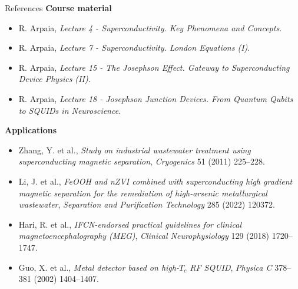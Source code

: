 \documentclass[aspectratio=169,11pt]{beamer}
\begin{document}
\begin{frame}[allowframebreaks]{References}
\label{slide:references}
\footnotesize
\textbf{Course material}
\begin{itemize}
  \item R. Arpaia, \textit{Lecture 4 - Superconductivity. Key Phenomena and Concepts}.
  \item R. Arpaia, \textit{Lecture 7 - Superconductivity. London Equations (I)}.
  \item R. Arpaia, \textit{Lecture 15 - The Josephson Effect. Gateway to Superconducting Device Physics (II)}.
  \item R. Arpaia, \textit{Lecture 18 - Josephson Junction Devices. From Quantum Qubits to SQUIDs in Neuroscience}.
\end{itemize}

\textbf{Applications}
\begin{itemize}
  \item Zhang, Y. et al., \textit{Study on industrial wastewater treatment using superconducting magnetic separation}, \textit{Cryogenics} 51 (2011) 225--228.
  \item Li, J. et al., \textit{FeOOH and nZVI combined with superconducting high gradient magnetic separation for the remediation of high-arsenic metallurgical wastewater}, \textit{Separation and Purification Technology} 285 (2022) 120372.
  \item Hari, R. et al., \textit{IFCN-endorsed practical guidelines for clinical magnetoencephalography (MEG)}, \textit{Clinical Neurophysiology} 129 (2018) 1720--1747.
  \item Guo, X. et al., \textit{Metal detector based on high-$T_c$ RF SQUID}, \textit{Physica C} 378--381 (2002) 1404--1407.
\end{itemize}
\end{frame}
\end{document}
